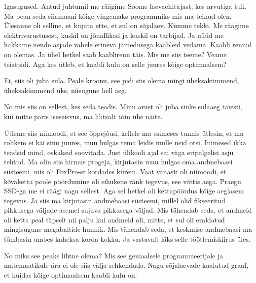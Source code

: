 
Igasugused. Antud juhtumil me räägime Soome laevaehitajast, kes arvutiga tuli. Ma pean seda siiamaani kõige vingemaks programmiks mis ma teinud olen. Ülesanne oli selline, et kujuta ette, et sul on sõjalaev. Kümme tekki. Me räägime elektrivarustusest, kuskil on jõuallikad ja kuskil on tarbijad. Ja nüüd me hakkame nende asjade vahele erineva jämedusega kaableid vedama. Kaabli rennid on olemas. Ja ühel hetkel saab kaablirenn täis. Mis me siis teeme? Veame teistpidi. Aga kes ütleb, et kaabli kulu on selle juures kõige optimaalsem? 


Ei, siis oli juba sula. Peale kroonu, see pidi siis olema mingi üheksakümmend, üheksakümmend üks, niisugune hell aeg.


No mis siis on sellest, kes seda teadis. Minu arust oli juba siuke sulaaeg täiesti, kui mitte päris iseseisvus, ma lihtsalt tõin ühe näite. 


Ütleme siis niimoodi, et see õppejõud, kellele ma esimeses tunnis ütlesin, et ma rohkem ei käi sinu juures, muu hulgas tema leidis mulle neid otsi. Inimesed ikka teadsid mind,  oskaksid soovitada. Just ülikooli ajal sai väga eripalgelisi asju tehtud. Ma olin siis hirmus progeja, kirjutasin muu hulgas oma andmebaasi süsteemi, mis oli FoxPro-st  kordades kiirem. Vaat vanasti oli niimoodi, et kõvaketta poole pöördumine oli sihukene ränk tegevus, see võttis aega. Praegu SSD-ga me ei räägi nagu sellest. Aga sel hetkel oli kettapöördus kõige aeglasem tegevus. Ja siis ma kirjutasin andmebaasi süsteemi, millel olid fikseeritud pikkusega väljade asemel  sujuva pikkusega väljad. Mis tähendab seda, et andmeid oli ketta peal täpselt nii palju kui andmeid oli, mitte, et sul oli eraldatud mingisugune megabaitide hunnik. Mis tähendab seda, et keskmise andmebaasi ma tõmbasin umbes kaheksa korda kokku. Ja vastavalt läks selle töötlemiskiirus  üles.


No miks see peaks lihtne olema? Mis see geniaalsele programmeerijale ja matemaatikule ära ei ole siis välja rehkendada. Nagu sõjalaevade kaalutud graaf, et kuidas kõige optimaalsem kaabli kulu on. 


